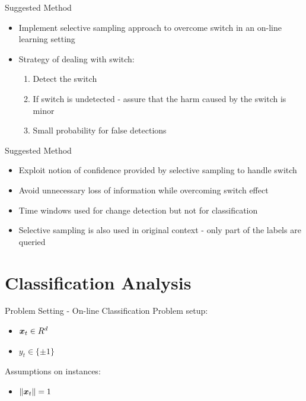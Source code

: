 \documentclass{beamer}
\begin{document}
\begin{frame}{Suggested Method}
\begin{itemize}
\item Implement selective sampling approach to overcome switch in an on-line learning setting\newline
\item Strategy of dealing with switch:\newline
\begin{enumerate}
\item Detect the switch\newline
\item If switch is undetected - assure that the harm caused by the switch is minor\newline
\item Small probability for false detections
\end{enumerate}
\end{itemize}

\end{frame}

\begin{frame}{Suggested Method}
\begin{itemize}
\item Exploit notion of confidence provided by selective sampling to handle switch\newline
\item Avoid unnecessary loss of information while overcoming switch effect\newline
\item Time windows used for change detection but not for classification\newline
\item Selective sampling is also used in original context - only part of the labels are queried
\end{itemize}
\end{frame}



\section{Classification Analysis}




\begin{frame}{Problem Setting - On-line Classification}
Problem setup:\newline
\begin{itemize}
\item ${\boldsymbol{x}}_{t}\in R^d$\newline
\item $y_t\in\{\pm1\}$\newline
\end{itemize}
Assumptions on instances:\newline
\begin{itemize}
\item $\|{\boldsymbol{x}}_{t}\|=1$
\end{itemize}
\end{frame}
\end{document}
